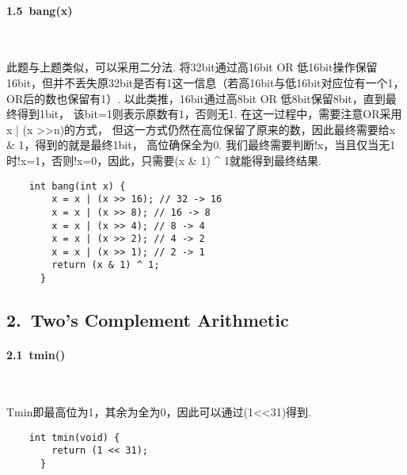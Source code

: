 \documentclass[UTF8]{ctexart}
\begin{document}
\paragraph*{1.5\ bang(x)}\ \par
此题与上题类似，可以采用二分法. 将32bit通过高16bit OR 低16bit操作保留16bit，但并不丢失原32bit是否有1这一信息（若高16bit与低16bit对应位有一个1，OR后的数也保留有1）. 以此类推，16bit通过高8bit OR 低8bit保留8bit，直到最终得到1bit，
该bit=1则表示原数有1，否则无1. 在这一过程中，需要注意OR采用x | (x \textgreater\textgreater n)的方式，
但这一方式仍然在高位保留了原来的数，因此最终需要给x \& 1，得到的就是最终1bit，
高位确保全为0. 我们最终需要判断!x，当且仅当无1时!x=1，否则!x=0，因此，只需要(x \& 1) \^{} 1就能得到最终结果.

\begin{lstlisting}
    int bang(int x) {
        x = x | (x >> 16); // 32 -> 16
        x = x | (x >> 8); // 16 -> 8 
        x = x | (x >> 4); // 8 -> 4 
        x = x | (x >> 2); // 4 -> 2 
        x = x | (x >> 1); // 2 -> 1 
        return (x & 1) ^ 1;
      }
\end{lstlisting}

\subsection*{2.\ Two’s Complement Arithmetic}
\paragraph*{2.1\ tmin()}\ \par
Tmin即最高位为1，其余为全为0，因此可以通过(1\textless\textless 31)得到.
\begin{lstlisting}
    int tmin(void) {
        return (1 << 31);
      }
\end{lstlisting}
\end{document}
